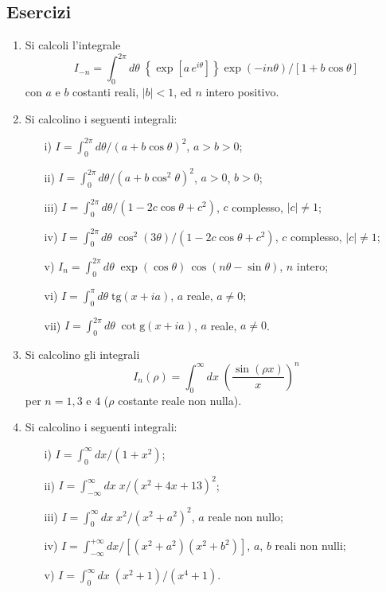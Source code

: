 \documentclass[11pt, a4paper]{book}
\numberwithin{equation}{section}
\newenvironment{esercizi}{\subsection*{Esercizi}\begin{enumerate}}{\end{enumerate}}
\begin{document}
\begin{esercizi}
\item Si calcoli l'integrale
\[
I_{-n} = \int_0^{2\pi} d\theta\; \left\{\exp\!\left[a\,e^{i\theta}\right]\right\} \exp(-in\theta) \big/ \left[1 + b\cos\theta\right]
\]
con $a$ e $b$ costanti reali, $|b|<1$, ed $n$ intero positivo.

\item Si calcolino i seguenti integrali:
\begin{enumerate}
\item[i)] $I = \int_0^{2\pi} d\theta \big/ (a + b\cos\theta)^2$, \quad $a > b > 0$;
\item[ii)] $I = \int_0^{2\pi} d\theta \big/ (a + b\cos^2\theta)^2$, \quad $a > 0$, $b > 0$;
\item[iii)] $I = \int_0^{2\pi} d\theta \big/ (1 - 2c\cos\theta + c^2)$, \quad $c$ complesso, $|c| \neq 1$;
\item[iv)] $I = \int_0^{2\pi} d\theta\; \cos^2(3\theta) \big/ (1 - 2c\cos\theta + c^2)$, \quad $c$ complesso, $|c| \neq 1$;
\item[v)] $I_n = \int_0^{2\pi} d\theta\; \exp(\cos\theta)\,\cos(n\theta - \sin\theta)$, \quad $n$ intero;
\item[vi)] $I = \int_0^{\pi} d\theta\; \mathrm{tg}(x + ia)$, \quad $a$ reale, $a \neq 0$;
\item[vii)] $I = \int_0^{2\pi} d\theta\; \cot\mathrm{g}(x + ia)$, \quad $a$ reale, $a \neq 0$.
\end{enumerate}

\item Si calcolino gli integrali
\[
I_n(\rho) = \int_0^{\infty} dx\; \left(\frac{\sin(\rho x)}{x}\right)^n
\]
per $n=1, 3$ e $4$ ($\rho$ costante reale non nulla).

\item Si calcolino i seguenti integrali:
\begin{enumerate}
\item[i)] $I = \int_0^{\infty} dx \big/ (1+x^2)$;
\item[ii)] $I = \int_{-\infty}^{\infty} dx\; x \big/ (x^2+4x+13)^2$;
\item[iii)] $I = \int_0^{\infty} dx\; x^2 \big/ (x^2+a^2)^2$, \quad $a$ reale non nullo;
\item[iv)] $I = \int_{-\infty}^{+\infty} dx \big/ \left[(x^2+a^2)(x^2+b^2)\right]$, \quad $a$, $b$ reali non nulli;
\item[v)] $I = \int_0^{\infty} dx\; (x^2+1) \big/ (x^4+1)$.
\end{enumerate}


\end{esercizi}
\end{document}
